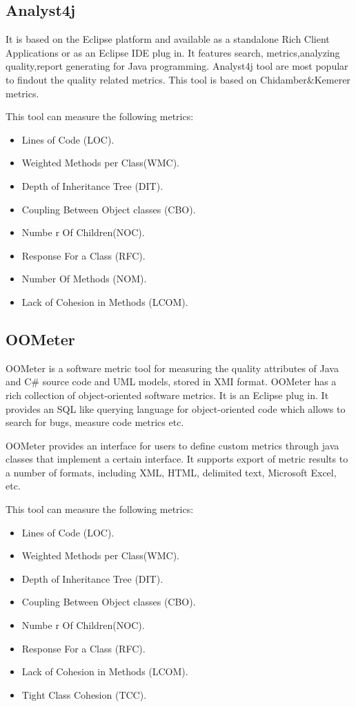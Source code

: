 \subsection{Analyst4j}
It is based on the Eclipse platform and available as a standalone Rich Client Applications or as an Eclipse
IDE plug in. It features search, metrics,analyzing quality,report generating for Java programming.
Analyst4j tool are most popular to findout the quality related metrics. This tool is based on Chidamber\&Kemerer metrics.

This tool can measure the following metrics:
\begin{itemize}
	\item Lines of Code (LOC). 
	\item Weighted Methods per Class(WMC).
	\item Depth of Inheritance Tree (DIT).
	\item Coupling Between Object classes (CBO).
	\item Numbe r Of Children(NOC).
	\item Response For a Class (RFC).
	\item Number Of Methods (NOM).
	\item Lack of Cohesion in Methods (LCOM).
\end{itemize}

\subsection{OOMeter}

OOMeter is a software metric tool for measuring the quality attributes of Java and C\# source code and UML models, stored in XMI format. OOMeter has a rich collection of object-oriented software metrics. It is an Eclipse plug in. It provides an SQL like querying language for object-oriented code which
allows to search for bugs, measure code metrics etc.

OOMeter provides an interface for users to define custom metrics through java classes that implement a certain interface. It supports export of metric results to a number of formats, including XML, HTML, delimited text, Microsoft Excel, etc.

This tool can measure the following metrics:

\begin{itemize}
	\item Lines of Code (LOC). 
	\item Weighted Methods per Class(WMC).
	\item Depth of Inheritance Tree (DIT).
	\item Coupling Between Object classes (CBO).
	\item Numbe r Of Children(NOC).
	\item Response For a Class (RFC).
	\item Lack of Cohesion in Methods (LCOM).
	\item Tight Class Cohesion (TCC).
\end{itemize}



